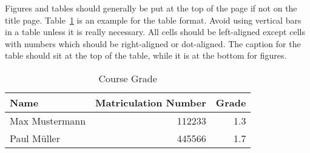 Figures and tables should generally be put at the top of the page if not on the title page. Table~\ref{tab:info} is an example for the table format. Avoid using vertical bars in a table unless it is really necessary. All cells should be left-aligned except cells with numbers which should be right-aligned or dot-aligned. The caption for the table should sit at the top of the table, while it is at the bottom for figures.

\begin{table}[!ht]
    \centering
    \caption{Course Grade}\label{tab:info}
    \begin{tabular}{@{}lrr@{}}
        \toprule
        \textbf{Name} & \textbf{Matriculation Number} & \textbf{Grade} \\
        \midrule
        Max Mustermann & 112233 & 1.3 \\
        Paul M\"uller & 445566 & 1.7 \\
        \bottomrule
    \end{tabular}
\end{table}